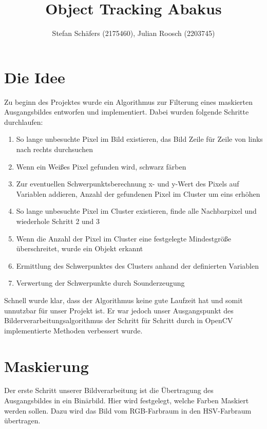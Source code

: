 \documentclass[12pt]{article}
\title{Object Tracking Abakus}
\author{Stefan Schäfers (2175460), Julian Roosch (2203745)}
\begin{document}
\maketitle
\section{Die Idee}
Zu beginn des Projektes wurde ein Algorithmus zur Filterung eines maskierten Ausgangsbildes entworfen und implementiert. Dabei wurden folgende Schritte durchlaufen:
\begin{enumerate}
\item So lange unbesuchte Pixel im Bild existieren, das Bild Zeile für Zeile von links nach rechts durchsuchen
\item Wenn ein Weißes Pixel gefunden wird, schwarz färben
\item Zur eventuellen Schwerpunktsberechnung x- und y-Wert des Pixels auf Variablen addieren, Anzahl der gefundenen Pixel im Cluster um eins erhöhen
\item So lange unbesuchte Pixel im Cluster existieren, finde alle Nachbarpixel und wiederhole Schritt 2 und 3
\item Wenn die Anzahl der Pixel im Cluster eine festgelegte Mindestgröße überschreitet, wurde ein Objekt erkannt
\item Ermittlung des Schwerpunktes des Clusters anhand der definierten Variablen
\item Verwertung der Schwerpunkte durch Sounderzeugung
\end{enumerate}

Schnell wurde klar, dass der Algorithmus keine gute Laufzeit hat und somit unnutzbar für unser Projekt ist. Er war jedoch unser Ausgangspunkt des Bilderverarbeitungsalgorithmus der Schritt für Schritt durch in OpenCV implementierte Methoden verbessert wurde.
\section{Maskierung}
Der erste Schritt unserer Bildverarbeitung ist die Übertragung des Ausgangsbildes in ein Binärbild. Hier wird festgelegt, welche Farben Maskiert werden sollen. Dazu wird das Bild vom RGB-Farbraum in den HSV-Farbraum übertragen. 
\end{document}
